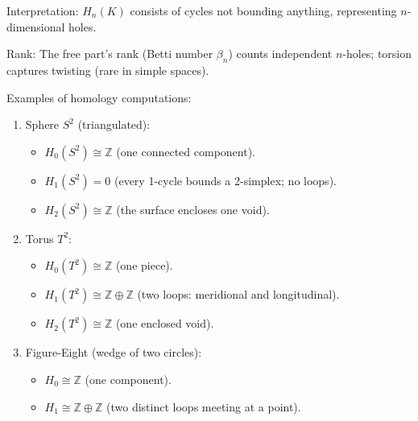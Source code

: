 \begin{proposition}
Interpretation: $H_n(K)$ consists of cycles not bounding anything, representing $n$-dimensional holes.
\end{proposition}

\begin{definition}
Rank: The free part's rank (Betti number $\beta_n$) counts independent $n$-holes; torsion captures twisting (rare in simple spaces).
\end{definition}

\begin{example}
Examples of homology computations:
\begin{enumerate}
    \item Sphere $S^2$ (triangulated):
    \begin{itemize}
        \item $H_0(S^2) \cong \mathbb{Z}$ (one connected component).
        \item $H_1(S^2) = 0$ (every 1-cycle bounds a 2-simplex; no loops).
        \item $H_2(S^2) \cong \mathbb{Z}$ (the surface encloses one void).
    \end{itemize}
    
    \item Torus $T^2$:
    \begin{itemize}
        \item $H_0(T^2) \cong \mathbb{Z}$ (one piece).
        \item $H_1(T^2) \cong \mathbb{Z} \oplus \mathbb{Z}$ (two loops: meridional and longitudinal).
        \item $H_2(T^2) \cong \mathbb{Z}$ (one enclosed void).
    \end{itemize}
    
    \item Figure-Eight (wedge of two circles):
    \begin{itemize}
        \item $H_0 \cong \mathbb{Z}$ (one component).
        \item $H_1 \cong \mathbb{Z} \oplus \mathbb{Z}$ (two distinct loops meeting at a point).
    \end{itemize}
\end{enumerate}
\end{example}

